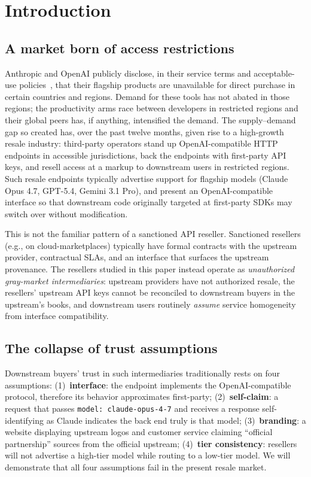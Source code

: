 \documentclass[10pt,a4paper,twocolumn]{article}
\begin{document}
\section{Introduction}\label{sec:intro}

\subsection{A market born of access restrictions}
Anthropic and OpenAI publicly disclose, in their service terms and acceptable-use
policies~\cite{anthropic2026aup,openai2026usage}, that their flagship products
are unavailable for direct purchase in certain countries and regions. Demand
for these tools has not abated in those regions; the productivity arms race
between developers in restricted regions and their global peers has, if
anything, intensified the demand. The supply--demand gap so created has, over
the past twelve months, given rise to a high-growth resale industry: third-party
operators stand up OpenAI-compatible HTTP endpoints in accessible jurisdictions,
back the endpoints with first-party API keys, and resell access at a markup to
downstream users in restricted regions. Such resale endpoints typically
advertise support for flagship models (Claude Opus 4.7, GPT-5.4, Gemini 3.1
Pro), and present an OpenAI-compatible interface so that downstream code
originally targeted at first-party SDKs may switch over without modification.

This is not the familiar pattern of a sanctioned API reseller. Sanctioned
resellers (e.g., on cloud-marketplaces) typically have formal contracts with
the upstream provider, contractual SLAs, and an interface that surfaces the
upstream provenance. The resellers studied in this paper instead operate as
\emph{unauthorized gray-market intermediaries}: upstream providers have not
authorized resale, the resellers' upstream API keys cannot be reconciled to
downstream buyers in the upstream's books, and downstream users routinely
\emph{assume} service homogeneity from interface compatibility.

\subsection{The collapse of trust assumptions}
Downstream buyers' trust in such intermediaries traditionally rests on four
assumptions: (1)~\textbf{interface}: the endpoint implements the
OpenAI-compatible protocol, therefore its behavior approximates first-party;
(2)~\textbf{self-claim}: a request that passes \texttt{model: claude-opus-4-7}
and receives a response self-identifying as Claude indicates the back end truly
is that model; (3)~\textbf{branding}: a website displaying upstream logos and
customer service claiming ``official partnership'' sources from the official
upstream; (4)~\textbf{tier consistency}: resellers will not advertise a
high-tier model while routing to a low-tier model. We will demonstrate that all four
assumptions fail in the present resale market.
\end{document}

